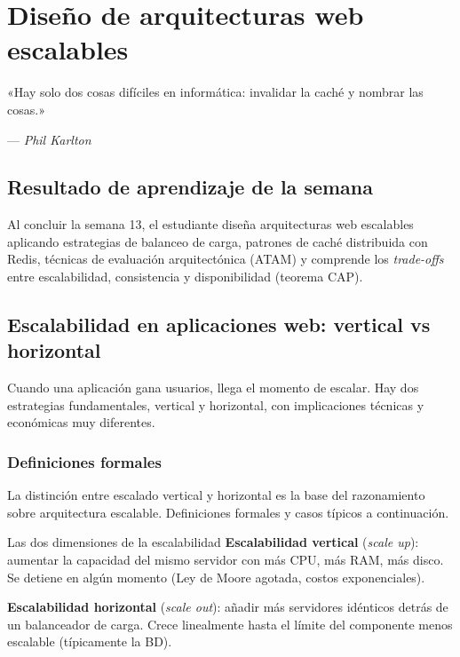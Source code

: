\documentclass[11pt,a4paper,openany]{book}
\begin{document}
\chapter{Diseño de arquitecturas web escalables}
\label{cap:semana13}

\epigraph{«Hay solo dos cosas difíciles en informática: invalidar la
caché y nombrar las cosas.»}{--- \textit{Phil Karlton}}

\section*{Resultado de aprendizaje de la semana}
Al concluir la semana 13, el estudiante diseña arquitecturas web
escalables aplicando estrategias de balanceo de carga, patrones de
caché distribuida con Redis, técnicas de evaluación arquitectónica
(ATAM) y comprende los \emph{trade-offs} entre escalabilidad,
consistencia y disponibilidad (teorema CAP).

\section{Escalabilidad en aplicaciones web: vertical vs horizontal}

Cuando una aplicación gana usuarios, llega el momento de
escalar. Hay dos estrategias fundamentales, vertical y horizontal,
con implicaciones técnicas y económicas muy diferentes.


\subsection{Definiciones formales}

La distinción entre escalado vertical y horizontal es la
base del razonamiento sobre arquitectura escalable. Definiciones
formales y casos típicos a continuación.


\begin{cajadefinicion}{Las dos dimensiones de la escalabilidad}
\textbf{Escalabilidad vertical} (\emph{scale up}): aumentar la
capacidad del mismo servidor con más CPU, más RAM, más disco. Se
detiene en algún momento (Ley de Moore agotada, costos exponenciales).

\textbf{Escalabilidad horizontal} (\emph{scale out}): añadir más
servidores idénticos detrás de un balanceador de carga. Crece
linealmente hasta el límite del componente menos escalable
(típicamente la BD).
\end{cajadefinicion}
\end{document}
